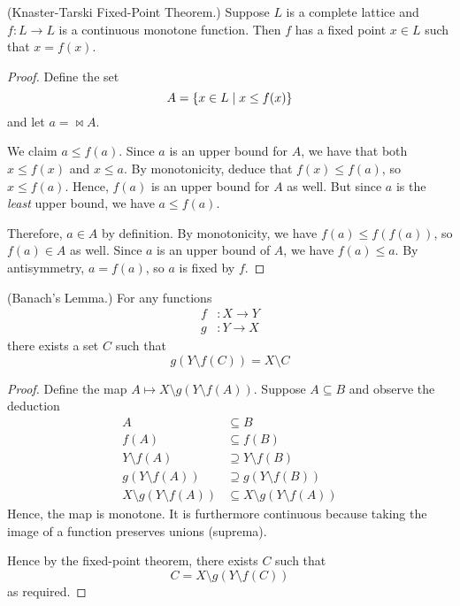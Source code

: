 \documentclass[11pt]{article}
\begin{document}
\begin{prop}{(Knaster-Tarski Fixed-Point Theorem.)}
    Suppose $L$ is a complete lattice and $f : L \to L$ is a continuous
    monotone function.
    Then $f$ has a fixed point $x \in L$ such that $x = f(x)$.
\end{prop}

\begin{proof}
    Define the set
    \begin{equation*}
        A = \left\{x \in L \;\vert\; x \leq f(x)\right\}
    \end{equation*}
    and let $a = \Join A$.

    We claim $a \leq f(a)$.
    Since $a$ is an upper bound for $A$,
    we have that both $x \leq f(x)$ and $x \leq a$.
    By monotonicity, deduce that $f(x) \leq f(a)$, so $x \leq f(a)$.
    Hence, $f(a)$ is an upper bound for $A$ as well.
    But since $a$ is the \emph{least} upper bound, we have $a \leq f(a)$.

    Therefore, $a \in A$ by definition.
    By monotonicity, we have $f(a) \leq f(f(a))$,
    so $f(a) \in A$ as well.
    Since $a$ is an upper bound of $A$, we have $f(a) \leq a$.
    By antisymmetry, $a = f(a)$, so $a$ is fixed by $f$.
\end{proof}

\begin{prop}{(Banach's Lemma.)}
    For any functions
    \begin{align*}
        f &: X \to Y \\
        g &: Y \to X
    \end{align*}
    there exists a set $C$ such that
    \begin{equation*}
        g(Y \setminus f(C)) = X \setminus C
    \end{equation*}
\end{prop}

\begin{proof}
    Define the map $A \mapsto X \setminus g(Y \setminus f(A))$.
    Suppose $A \subseteq B$ and observe the deduction
    \begin{align*}
        A &\subseteq B \\
        f(A) &\subseteq f(B) \\
        Y \setminus f(A) &\supseteq Y \setminus f(B) \\
        g(Y \setminus f(A)) &\supseteq g(Y \setminus f(B)) \\
        X \setminus g(Y \setminus f(A))
            &\subseteq X \setminus g(Y \setminus f(A))
    \end{align*}
    Hence, the map is monotone. It is furthermore continuous because taking the
    image of a function preserves unions (suprema).

    Hence by the fixed-point theorem, there exists $C$ such that
    \begin{equation*}
        C = X \setminus g(Y \setminus f(C))
    \end{equation*}
    as required.
\end{proof}
\end{document}
